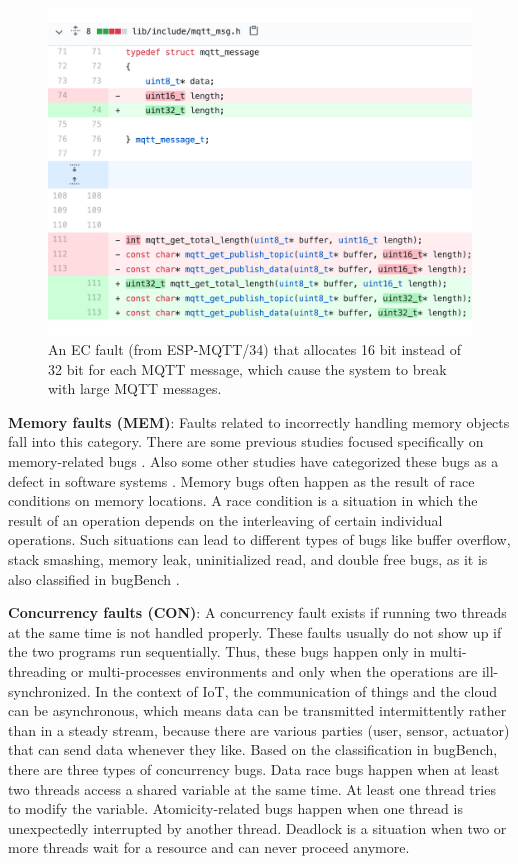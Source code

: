  \begin{figure}%
  \centering
   \includegraphics[width=\linewidth]{imgs/rc8}
  \caption{An EC fault (from ESP-MQTT/34) that allocates 16 bit instead of 32 bit for each MQTT message, which cause the system to break with large MQTT messages.}
  \label{fig:rc8}
\end{figure}
 
\textbf{Memory faults (MEM)}: Faults related to incorrectly handling memory objects fall into this category. There are some previous studies focused specifically on memory-related bugs \cite{memBugs}. Also some other studies have categorized these bugs as a defect in software systems \cite{openSourceBugs}. Memory bugs often happen as the result of race conditions on memory locations. A race condition is a situation in which the result of an operation depends on the interleaving of certain individual operations. Such situations can lead to different types of bugs like buffer overflow, stack smashing, memory leak, uninitialized read, and double free bugs, as it is also classified in bugBench \cite{bugBench}.

\textbf{Concurrency faults (CON)}: A concurrency fault exists if running two threads at the same time is not handled properly. These faults usually do not show up if the two programs run sequentially. Thus, these bugs happen only in multi-threading or multi-processes environments and only when the operations are ill-synchronized. In the context of IoT, the communication of things and the cloud can be asynchronous, which means data can be transmitted intermittently rather than in a steady stream, because there are various parties (user, sensor, actuator) that can send data whenever they like. Based on the classification in bugBench, there are three types of concurrency bugs. Data race bugs happen when at least two threads access a shared variable at the same time. At least one thread tries to modify the variable. Atomicity-related bugs happen when one thread is unexpectedly interrupted by another thread. Deadlock is a situation when two or more threads wait for a resource and can never proceed anymore. 


